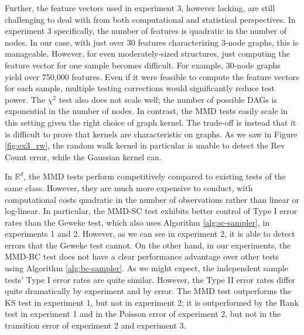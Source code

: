 \documentclass[a4paper,11pt]{article}
\begin{document}
Further, the feature vectors used in experiment 3, however lacking, are still challenging to deal with from both computational and statistical perspectives. In experiment 3 specifically, the number of features is quadratic in the number of nodes. In our case, with just over 30 features characterizing 3-node graphs, this is manageable. However, for even moderately-sized structures, just computing the feature vector for one sample becomes difficult. For example, 30-node graphs yield over 750,000 features. Even if it were feasible to compute the feature vectors for each sample, multiple testing corrections would significantly reduce test power. The $\chi^{2}$ test also does not scale well; the number of possible DAGs is exponential in the number of nodes. In contrast, the MMD tests easily scale in this setting given the right choice of graph kernel. The trade-off is instead that it is difficult to prove that kernels are characteristic on graphs. As we saw in Figure \ref{fig:ex3_rw}, the random walk kernel in particular is unable to detect the Rev Count error, while the Gaussian kernel can.

In $\mathbb{R}^{d}$, the MMD tests perform competitively compared to existing tests of the same class. However, they are much more expensive to conduct, with computational costs quadratic in the number of observations rather than linear or log-linear. In particular, the MMD-SC test exhibits better control of Type I error rates than the Geweke test, which also uses Algorithm \ref{alg:sc-sampler}, in experiments 1 and 2. However, as we can see in experiment 2, it is able to detect errors that the Geweke test cannot. On the other hand, in our experiments, the MMD-BC test does not have a clear performance advantage over other tests using Algorithm \ref{alg:bc-sampler}. As we might expect, the independent sample tests' Type I error rates are quite similar. However, the Type II error rates differ quite dramatically by experiment and by error. The MMD test outperforms the KS test in experiment 1, but not in experiment 2; it is outperformed by the Rank test in experiment 1 and in the Poisson error of experiment 2, but not in the transition error of experiment 2 and experiment 3. 
\end{document}
